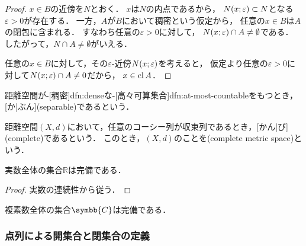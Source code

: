 \documentclass[../sotsu.tex]{subfiles}
\begin{document}
\begin{proof}
    \quad 
    $x \in B$の近傍を$N$とおく．
    $x$は$N$の内点であるから，
    $N(x; \varepsilon) \subset N$となる$\varepsilon > 0$が存在する．
    一方，$A$が$B$において稠密という仮定から，
    任意の$x \in B$は$A$の閉包に含まれる．
    すなわち任意の$\varepsilon > 0$に対して，
    $N(x; \varepsilon) \cap A \neq \emptyset$である．
    したがって，$N \cap A \neq \emptyset$がいえる．

    \quad 
    任意の$x \in B$に対して，その$\varepsilon$-近傍$N(x; \varepsilon)$を考えると，
    仮定より任意の$\varepsilon > 0$に対して$N(x; \varepsilon) \cap A \neq 0$だから，
    $x \in \operatorname{cl}{A}$．
\end{proof}


\begin{definition}
    \label{dfn:separable}
    距離空間が-[稠密]{dfn:dense}な-[高々可算集合]{dfn:at-most-countable}をもつとき，
    [か|ぶん](separable)であるという．
\end{definition}


\begin{definition}
    \label{dfn:complete-metric-space}
    距離空間$(X, d)$において，任意のコーシー列が収束列であるとき，[かん|び](complete)であるという．
    このとき，$(X, d)$のことを(complete metric space)という．
\end{definition}


\begin{proposition}[実数の完備性]
    \label{thm:completeness-of-real-numbers}
    実数全体の集合$ℝ$は完備である．
\end{proposition}

\begin{proof}
    実数の連続性から従う．
\end{proof}


\begin{corollary}
    \label{thm:completeness-of-complex-numbers}
    複素数全体の集合$\symbb{C}$は完備である．
\end{corollary}



\subsubsection*{点列による開集合と閉集合の定義}
\end{document}
